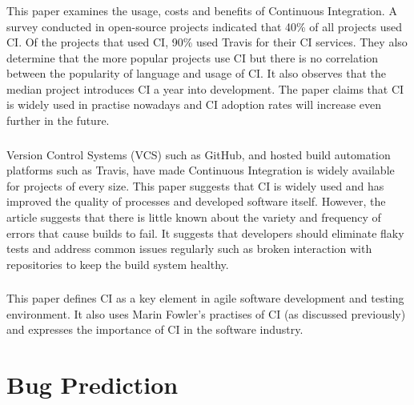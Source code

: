 \documentclass[]{book}
\begin{document}
\subsection{\texorpdfstring{\citet{hilton2016usage}}{@hilton2016usage}}\label{hilton2016usage-1}

This paper examines the usage, costs and benefits of Continuous
Integration. A survey conducted in open-source projects indicated that
40\% of all projects used CI. Of the projects that used CI, 90\% used
Travis for their CI services. They also determine that the more popular
projects use CI but there is no correlation between the popularity of
language and usage of CI. It also observes that the median project
introduces CI a year into development. The paper claims that CI is
widely used in practise nowadays and CI adoption rates will increase
even further in the future.

\subsection{\texorpdfstring{\citet{rausch2017empirical}}{@rausch2017empirical}}\label{rausch2017empirical-1}

Version Control Systems (VCS) such as GitHub, and hosted build
automation platforms such as Travis, have made Continuous Integration is
widely available for projects of every size. This paper suggests that CI
is widely used and has improved the quality of processes and developed
software itself. However, the article suggests that there is little
known about the variety and frequency of errors that cause builds to
fail. It suggests that developers should eliminate flaky tests and
address common issues regularly such as broken interaction with
repositories to keep the build system healthy.

\subsection{\texorpdfstring{\citet{stolberg2009enabling}}{@stolberg2009enabling}}\label{stolberg2009enabling}

This paper defines CI as a key element in agile software development and
testing environment. It also uses Marin Fowler's practises of CI (as
discussed previously) and expresses the importance of CI in the software
industry.

\chapter{Bug Prediction}\label{bug-prediction}
\end{document}
